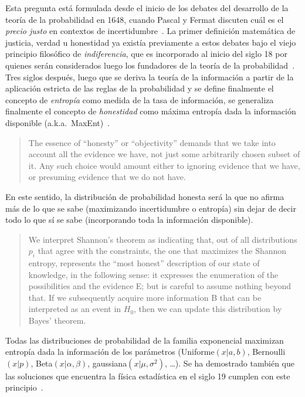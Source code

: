 \documentclass[a4paper,11pt]{book}
\theoremstyle{definition}
\begin{document}
Esta pregunta est\'a formulada desde el inicio de los debates del desarrollo de la teor\'ia de la probabilidad en 1648, cuando Pascal y Fermat discuten cu\'al es el \emph{precio justo} en contextos de incertidumbre~\cite{Devlin2008}.
%
La primer definici\'on matem\'atica de justicia, verdad u honestidad ya exist\'ia previamente a estos debates bajo el viejo principio filos\'ofico de \emph{indiferencia}, que es incorporado al inicio del siglo 18 por quienes ser\'an considerados luego los fundadores de la teor\'ia de la probabilidad~\cite{jaynes1984-bayesianBackground}.
%
Tres siglos despu\'es, luego que se deriva la teor\'ia de la informaci\'on a partir de la aplicaci\'on estricta de las reglas de la probabilidad y se define finalmente el concepto de \emph{entrop\'ia} como medida de la tasa de informaci\'on, se generaliza finalmente el concepto de \emph{honestidad} como m\'axima entrop\'ia dada la informaci\'on disponible (a.k.a.~MaxEnt)~\cite{Jaynes2003}.
%
\begin{quotation}
The essence of ``honesty'' or ``objectivity'' demands that we take into account all the evidence we have, not just some arbitrarily chosen subset of it. Any such choice would amount either to ignoring evidence that we have, or presuming evidence that we do not have.
\end{quotation}
%
En este sentido, la distribuci\'on de probabilidad honesta será la que no afirma m\'as de lo que se sabe (maximizando incertidumbre o entropía) sin dejar de decir todo lo que s\'i se sabe (incorporando toda la informaci\'on disponible).
%
\begin{quotation}
We interpret Shannon's theorem as indicating that, out of all distributions $p_i$ that agree with the constraints, the one that maximizes the Shannon entropy, represents the ``most honest'' description of our state of knowledge, in the following sense: it expresses the enumeration of the possibilities and the evidence E; but is careful to assume nothing beyond that. If we subsequently acquire more information B that can be interpreted as an event in $H_0$, then we can update this distribution by Bayes' theorem. \cite{jaynes1984-bayesianBackground}
\end{quotation}
%
Todas las distribuciones de probabilidad de la familia exponencial maximizan entrop\'ia dada la informaci\'on de los par\'ametros (Uniforme$(x|a,b)$, Bernoulli$(x|p)$, Beta$(x|\alpha, \beta)$, gaussiana$(x|\mu, \sigma^2)$, \dots).
%
Se ha demostrado tambi\'en que las soluciones que encuentra la f\'isica estad\'istica en el siglo 19 cumplen con este principio~\cite{jaynes1957-I, jaynes1957-II}.
\end{document}
